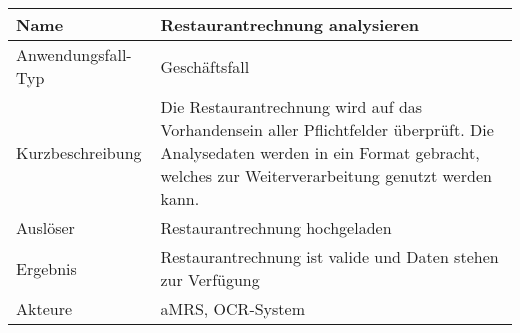 \begin{table}[H]
    \centering
    \label{}
    \begin{tabularx}{\textwidth}{| l | X |}
        \hline
        Name               & Restaurantrechnung analysieren                                                                                                                                                       \\
        \hline
        Anwendungsfall-Typ & Geschäftsfall                                                                                                                                                                        \\
        \hline
        Kurzbeschreibung   & Die Restaurantrechnung wird auf das Vorhandensein aller Pflichtfelder überprüft. Die Analysedaten werden in ein Format gebracht, welches zur Weiterverarbeitung genutzt werden kann. \\
        \hline
        Auslöser           & Restaurantrechnung hochgeladen                                                                                                                                                       \\
        \hline
        Ergebnis           & Restaurantrechnung ist valide und Daten stehen zur Verfügung                                                                                                                         \\
        \hline
        Akteure            & \ac{aMRS}, OCR-System                                                                                                                                                                \\
        \hline
    \end{tabularx}
\end{table}


